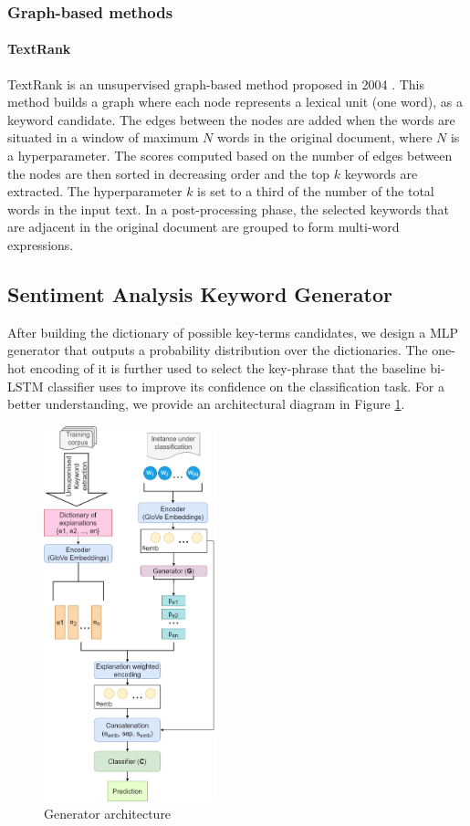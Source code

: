 \subsubsection{Graph-based methods}
\paragraph{TextRank}
TextRank is an unsupervised graph-based method proposed in 2004 \cite{TextRank}. This method builds a graph where each node represents a lexical unit (one word), as a keyword candidate. The edges between the nodes are added when the words are situated in a window of maximum $N$ words in the original document, where $N$ is a hyperparameter. The scores computed based on the number of edges between the nodes are then sorted in decreasing order and the top $k$ keywords are extracted. The hyperparameter $k$ is set to a third of the number of the total words in the input text. In a post-processing phase, the selected keywords that are adjacent in the original document are grouped to form multi-word expressions.

\subsection{Sentiment Analysis Keyword Generator}\label{generator}
After building the dictionary of possible key-terms candidates, we design a MLP generator that outputs a probability distribution over the dictionaries. The one-hot encoding of it is further used to select the key-phrase that the baseline bi-LSTM classifier uses to improve its confidence on the classification task.
For a better understanding, we provide an architectural diagram in Figure \ref{fig:gen}.


\begin{figure}[!h]
\centering
  \includegraphics[width=5cm]{Images/gen.png}
  \caption{Generator architecture}\label{fig:gen}
\end{figure}